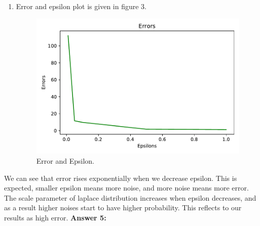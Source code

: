 \documentclass[12pt,reqno]{amsart}
\begin{document}
\begin{enumerate}[label=(\alph*)]
\item Error and epsilon plot is given in figure 3.
\begin{figure}[ht]
 	\label{fig:err}
 	\caption{Error and Epsilon.}
 	\includegraphics[width=0.7\linewidth]{img/errorEps.pdf}
\end{figure}
\end{enumerate}
We can see that error rises exponentially when we decrease epsilon. This is expected, smaller epsilon means more noise, and more noise means more error. The scale parameter of laplace distribution increases when epsilon decreases, and as a result higher noises start to have higher probability. This reflects to our results as high error.
\newpage
\textbf{Answer 5:} 
\end{document}
